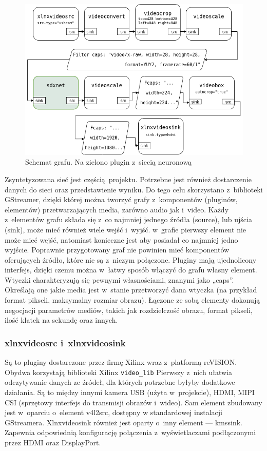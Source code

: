 \documentclass[12pt, oneside, a4paper]{article}
\begin{document}
\begin{figure}[h]
  \centering
  \includegraphics[width=\linewidth]{figures/pipeline.png}
  \caption{Schemat grafu. Na zielono plugin z~siecią neuronową}\label{fig:pipeline}
\end{figure}
Zsyntetyzowana sieć jest częścią projektu. Potrzebne jest również dostarczenie
danych do sieci oraz przedstawienie wyniku.
Do tego celu skorzystano z~biblioteki GStreamer, dzięki której można
tworzyć grafy z~komponentów (pluginów, elementów)
przetwarzających media, zarówno audio jak i~video.
Każdy z~elementów grafu składa się z~co najmniej jednego źródła (source),
lub ujścia (sink), może mieć również wiele wejść i~wyjść. w~grafie pierwszy
element nie może mieć wejść, natomiast konieczne jest aby posiadał co najmniej
jedno wyjście. Poprawnie przygotowany graf nie powinien mieć komponentów
oferujących źródło, które nie są z~niczym połączone.
Pluginy mają ujednolicony interfejs, dzięki czemu można w~łatwy sposób
włączyć do grafu własny element. Wtyczki charakteryzują się
pewnymi własnościami, znanymi jako „caps”. Określają one jakie 
media jest w~stanie przetworzyć dana wtyczka (na przykład format pikseli,
maksymalny rozmiar obrazu). 
Łączone ze sobą elementy dokonują negocjacji
parametrów mediów, takich jak rozdzielczość obrazu, format pikseli,
ilość klatek na sekundę oraz innych.

\subsubsection{xlnxvideosrc i~xlnxvideosink}
Są to pluginy dostarczone przez firmę Xilinx wraz z~platformą reVISION.
Obydwa korzystają biblioteki Xilinx \lstinline{video_lib}
Pierwszy z~nich ułatwia odczytywanie danych ze źródeł, dla których potrzebne
byłyby dodatkowe działania. Są to między innymi kamera USB (użyta w~projekcie),
HDMI, MIPI CSI (sprzętowy interfejs do transmisji obrazów i~wideo).
Sam element zbudowany jest w~oparciu o~element v4l2src, dostępny
w standardowej instalacji GStreamera.
Xlnxvideosink również jest oparty o~inny element --- kmssink.
Zapewnia odpowiednią konfigurację połączenia z~wyświetlaczami
podłączonymi przez HDMI oraz DisplayPort.
\end{document}
